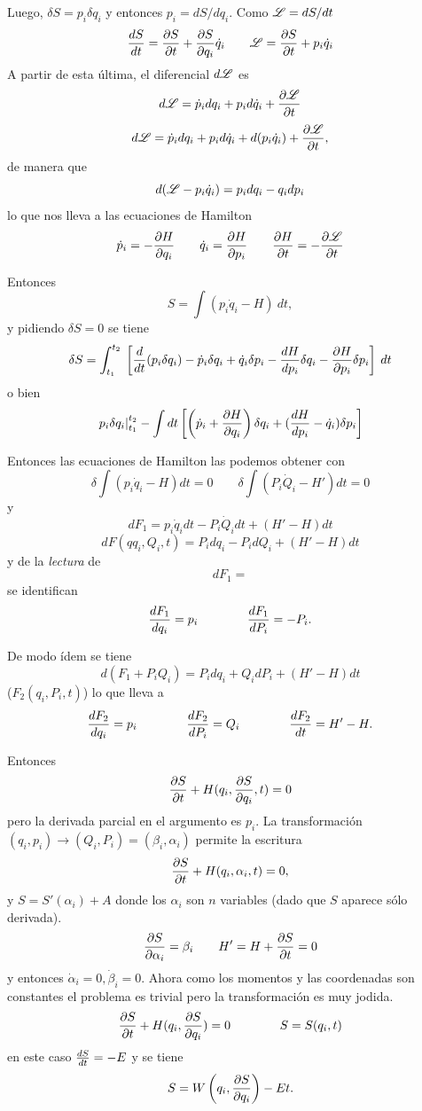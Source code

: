 \documentclass[10pt,oneside]{CBFT_book}
\begin{document}
Luego, $ \delta S = p_i \delta q_i  $ y entonces $ p_i = dS / dq_i $. Como $\Lag = dS / dt $
\[
	\dtot{S}{t} = \dpar{S}{t} + \dpar{S}{q_i} \dot{q}_i \qquad \Lag = \dpar{S}{t} + p_i \dot{q}_i
\]
A partir de esta última, el diferencial $d\Lag$ es
\[
	d\Lag = \dot{p}_i dq_i + p_i d\dot{q}_i + \dpar{\Lag}{t}
\]
\[
	d\Lag = \dot{p}_i dq_i + p_i d\dot{q}_i + d( p_i \dot{q}_i ) + \dpar{\Lag}{t},
\]
de manera que 
\[
	d( \Lag - p_i \dot{q}_i ) = p_i dq_i - q_i dp_i
\]
lo que nos lleva a las ecuaciones de Hamilton
\[
	\dot{p}_i = - \dpar{H}{q_i} \qquad \dot{q}_i = \dpar{H}{p_i} \qquad \dpar{H}{t} = - \dpar{\Lag}{t} 
\]

Entonces
\[
	S = \int ( p_i \dot{q}_i - H ) \: dt,
\]
y pidiendo $\delta S=0$ se tiene 
\[
	\delta S = \int_{t_1}^{t_2}  \: \left[ \dtot{}{t}( p_i \delta q_i ) - \dot{p}_i \delta q_i + \dot{q}_i \delta p_i 
	- \dtot{H}{p_i} \delta q_i - \dpar{H}{p_i} \delta p_i \right] \: dt
\]
o bien 
\[
	\left. p_i \delta q_i \right|_{t_1}^{t_2} - \int dt 
	\left[ \left( \dot{p}_i + \dpar{H}{q_i} \right) \delta q_i + ( \dtot{H}{p_i} - \dot{q}_i ) \delta p_i \right]
\]

Entonces las ecuaciones de Hamilton las podemos obtener con 
\[
	\delta \int ( p_i \dot{q}_i - H ) dt = 0 \qquad \delta \int ( P_i \dot{Q}_i - H' ) dt = 0
\]
y
\[
	dF_1 = p_i \dot{q}_i dt - P_i \dot{Q}_i dt + (H'-H)dt
\]
\[
	dF( qq_i, Q_i, t ) = P_i dq_i - P_i dQ_i + (H'- H)dt
\]
y de la {\it lectura} de 
\[
	dF_1 =
\]
se identifican 
\[
	\dtot{F_1}{q_i} = p_i \qquad \qquad \dtot{F_1}{P_i} = -P_i.
\]

De modo ídem se tiene 
\[
	d(F_1 + P_iQ_i) = P_i dq_i + Q_i dP_i + (H'-H)dt
\]
($F_2(q_i,P_i,t)$) lo que lleva a 
\[
	\dtot{F_2}{q_i} = p_i \qquad \qquad \dtot{F_2}{P_i} = Q_i \qquad \qquad \dtot{F_2}{t} = H'- H.
\]

Entonces
\[
	\dpar{S}{t} + H(q_i,\dpar{S}{q_i},t) = 0
\]
pero la derivada parcial en el argumento es $p_i$. La transformación $(q_i,p_i) \to (Q_i,P_i) = (\beta_i,\alpha_i)$ 
permite la escritura
\[
	\dpar{S}{t} + H(q_i,\alpha_i,t) = 0,
\]
y $S = S'(\alpha_i) + A$ donde los $\alpha_i$ son $n$ variables (dado que $S$ aparece sólo derivada).
\[
	\dpar{S}{\alpha_i} = \beta_i \qquad H'= H + \dpar{S}{t} = 0
\]
y entonces $ \dot{\alpha}_i = 0, \dot{\beta}_i=0 $. Ahora como los momentos y las coordenadas son constantes el problema
es trivial pero la transformación es muy jodida.
\[
	\dpar{S}{t} + H(q_i,\dpar{S}{q_i}) = 0 \qquad \qquad S = S(q_i,t)
\]
en este caso $ \dtot{S}{t} = -E $ y se tiene 
\[
	S = W\left( q_i,\dpar{S}{q_i} \right) - E t.
\]
\end{document}
